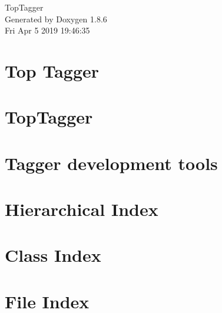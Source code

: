 \documentclass[twoside]{book}
\newcommand{\clearemptydoublepage}{%
  \newpage{\pagestyle{empty}\cleardoublepage}%
}
\begin{document}
\hypersetup{pageanchor=false}
\begin{titlepage}
\vspace*{7cm}
\begin{center}%
{\Large Top\-Tagger }\\
\vspace*{1cm}
{\large Generated by Doxygen 1.8.6}\\
\vspace*{0.5cm}
{\small Fri Apr 5 2019 19:46:35}\\
\end{center}
\end{titlepage}
\clearemptydoublepage
\tableofcontents
\clearemptydoublepage
{}
\hypersetup{pageanchor=true}

\chapter{Top Tagger}
\label{index}\hypertarget{index}{}
\chapter{Top\-Tagger}
\label{md__home_travis_build_susy2015_TopTagger_README}
\hypertarget{md__home_travis_build_susy2015_TopTagger_README}{}

\chapter{Tagger development tools}
\label{md__home_travis_build_susy2015_TopTagger_Tools_README}
\hypertarget{md__home_travis_build_susy2015_TopTagger_Tools_README}{}

\chapter{Hierarchical Index}

\chapter{Class Index}

\chapter{File Index}

\end{document}
